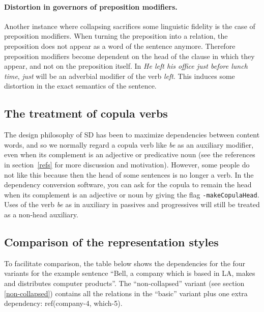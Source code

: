 \documentclass[11pt,letterpaper]{article}
\begin{document}
\paragraph{Distortion in governors of preposition modifiers.}
Another instance where collapsing sacrifices some linguistic fidelity is the case of preposition modifiers. When turning the preposition into a relation, the preposition does not appear as a word of the sentence anymore. Therefore preposition modifiers become dependent on the head of the clause in which they appear, and not on the preposition itself. In \emph{He left his office just before lunch time}, \emph{just} will be an adverbial modifier of the verb \emph{left}. This induces some distortion in the exact semantics of the sentence.

\subsection{The treatment of copula verbs}
The design philosophy of SD has been to maximize dependencies between
content words, and so we normally regard a copula verb like \emph{be}
as an auxiliary modifier, even when its complement is an adjective or
predicative noun (see the references in section~\ref{refs} for more discussion and motivation).  However, some people do not like this because then the head of some sentences is no longer a verb.  In the dependency conversion software, you can ask for the copula to remain the head when its complement is an adjective or noun by giving the flag \texttt{-makeCopulaHead}.  Uses of the verb \emph{be} as in auxiliary in passives and progressives will still be treated as a non-head auxiliary.

\subsection{Comparison of the representation styles}
\noindent To facilitate comparison, the table below shows the dependencies for the four variants for the example sentence ``Bell, a company which is based in LA, makes and distributes computer products''. The ``non-collapsed'' variant (see section \ref{non-collapsed}) contains all the relations in the ``basic'' variant plus one extra dependency: ref(company-4, which-5).

\bigskip
\end{document}
